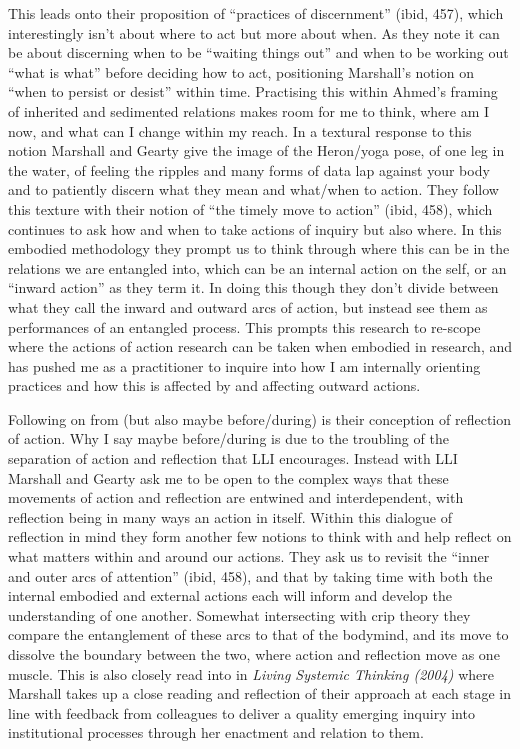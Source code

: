 This leads onto their proposition of ``practices of discernment'' (ibid,
457), which interestingly isn't about where to act but more about when.
As they note it can be about discerning when to be ``waiting things
out'' and when to be working out ``what is what'' before deciding how to
act, positioning Marshall's notion on ``when to persist or desist''
within time. Practising this within Ahmed's framing of inherited and
sedimented relations makes room for me to think, where am I now, and
what can I change within my reach. In a textural response to this notion
Marshall and Gearty give the image of the Heron/yoga pose, of one leg in
the water, of feeling the ripples and many forms of data lap against
your body and to patiently discern what they mean and what/when to
action. They follow this texture with their notion of ``the timely move
to action'' (ibid, 458), which continues to ask how and when to take
actions of inquiry but also where. In this embodied methodology they
prompt us to think through where this can be in the relations we are
entangled into, which can be an internal action on the self, or an
``inward action'' as they term it. In doing this though they don't
divide between what they call the inward and outward arcs of action, but
instead see them as performances of an entangled process. This prompts
this research to re-scope where the actions of action research can be
taken when embodied in research, and has pushed me as a practitioner to
inquire into how I am internally orienting practices and how this is
affected by and affecting outward actions.

Following on from (but also maybe before/during) is their conception of
reflection of action. Why I say maybe before/during is due to the
troubling of the separation of action and reflection that LLI
encourages. Instead with LLI Marshall and Gearty ask me to be open to
the complex ways that these movements of action and reflection are
entwined and interdependent, with reflection being in many ways an
action in itself. Within this dialogue of reflection in mind they form
another few notions to think with and help reflect on what matters
within and around our actions. They ask us to revisit the ``inner and
outer arcs of attention'' (ibid, 458), and that by taking time with both
the internal embodied and external actions each will inform and develop
the understanding of one another. Somewhat intersecting with crip theory
they compare the entanglement of these arcs to that of the bodymind, and
its move to dissolve the boundary between the two, where action and
reflection move as one muscle. This is also closely read into in
\emph{Living Systemic Thinking (2004)} where Marshall takes up a close
reading and reflection of their approach at each stage in line with
feedback from colleagues to deliver a quality emerging inquiry into
institutional processes through her enactment and relation to them.

